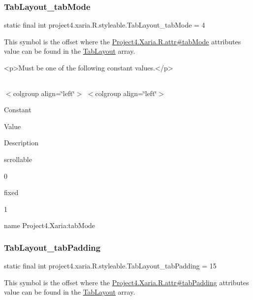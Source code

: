 \subsubsection{\texorpdfstring{Tab\+Layout\+\_\+tab\+Mode}{TabLayout\_tabMode}}
{\footnotesize\ttfamily static final int project4.\+xaria.\+R.\+styleable.\+Tab\+Layout\+\_\+tab\+Mode = 4\hspace{0.3cm}{\ttfamily [static]}}

This symbol is the offset where the \hyperlink{}{Project4.\+Xaria.\+R.\+attr\#tab\+Mode} attribute\textquotesingle{}s value can be found in the \hyperlink{classproject4_1_1xaria_1_1R_1_1styleable_ab6bfb1f97ae9fba16f4f90d50871d4a8}{Tab\+Layout} array.

\begin{DoxyVerb}      <p>Must be one of the following constant values.</p>
\end{DoxyVerb}
 \tabulinesep=1mm
\begin{longtabu} spread 0pt [c]{*{0}{|X[-1]}|}
\hline
\end{longtabu}
$<$colgroup align=\char`\"{}left\char`\"{}$>$ $<$colgroup align=\char`\"{}left\char`\"{}$>$ 

Constant

Value

Description 

{\ttfamily scrollable}

0

{\ttfamily fixed}

1

name Project4.\+Xaria\+:tab\+Mode \mbox{\label{classproject4_1_1xaria_1_1R_1_1styleable_ac7d60eaa3c996af7b321340db6e3a4f5}} 
\subsubsection{\texorpdfstring{Tab\+Layout\+\_\+tab\+Padding}{TabLayout\_tabPadding}}
{\footnotesize\ttfamily static final int project4.\+xaria.\+R.\+styleable.\+Tab\+Layout\+\_\+tab\+Padding = 15\hspace{0.3cm}{\ttfamily [static]}}

This symbol is the offset where the \hyperlink{}{Project4.\+Xaria.\+R.\+attr\#tab\+Padding} attribute\textquotesingle{}s value can be found in the \hyperlink{classproject4_1_1xaria_1_1R_1_1styleable_ab6bfb1f97ae9fba16f4f90d50871d4a8}{Tab\+Layout} array.

